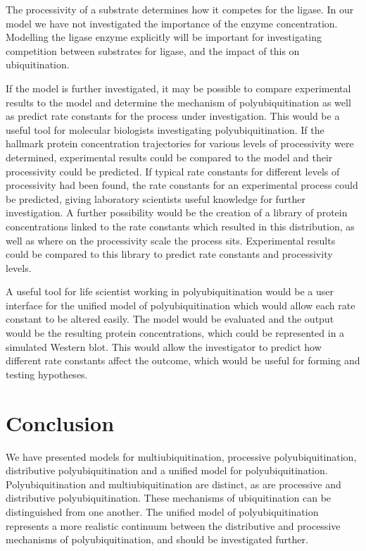 \documentclass[11pt]{article}
\begin{document}
The processivity of a substrate determines how it competes for the ligase. In our model we have not investigated the importance of the enzyme concentration. Modelling the ligase enzyme explicitly will be important for investigating competition between substrates for ligase, and the impact of this on ubiquitination.

If the model is further investigated, it may be possible to compare experimental results to the model and determine the mechanism of polyubiquitination as well as predict rate constants for the process under investigation. This would be a useful tool for molecular biologists investigating polyubiquitination. If the hallmark protein concentration trajectories for various levels of processivity were determined, experimental results could be compared to the model and their processivity could be predicted. If typical rate constants for different levels of processivity had been found, the rate constants for an experimental process could be predicted, giving laboratory scientists useful knowledge for further investigation. A further possibility would be the creation of a library of protein concentrations linked to the rate constants which resulted in this distribution, as well as where on the processivity scale the process sits. Experimental results could be compared to this library to predict rate constants and processivity levels.

A useful tool for life scientist working in polyubiquitination would be a user interface for the unified model of polyubiquitination which would allow each rate constant to be altered easily. The model would be evaluated and the output would be the resulting protein concentrations, which could be represented in a simulated Western blot. This would allow the investigator to predict how different rate constants affect the outcome, which would be useful for forming and testing hypotheses.

\section{Conclusion}
We have presented models for multiubiquitination, processive polyubiquitination, distributive polyubiquitination and a unified model for polyubiquitination. Polyubiquitination and multiubiquitination are distinct, as are processive and distributive polyubiquitination. These mechanisms of ubiquitination can be distinguished from one another. The unified model of polyubiquitination represents a more realistic continuum between the distributive and processive mechanisms of polyubiquitination, and should be investigated further.
\end{document}
